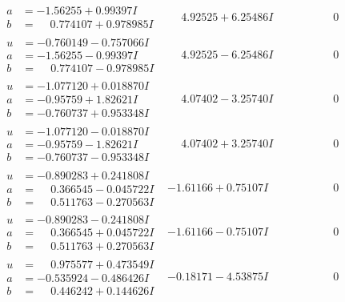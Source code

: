 \documentclass[1p]{elsarticle_modified}
\theoremstyle{definition}
\begin{document}
$$\begin{array}{c|c|c}
\begin{aligned}
a &= -1.56255 + 0.99397 I \\
b &= \phantom{-}0.774107 + 0.978985 I\end{aligned}
 & \phantom{-}4.92525 + 6.25486 I & \phantom{-0.000000 } 0 \\ \hline\begin{aligned}
u &= -0.760149 - 0.757066 I \\
a &= -1.56255 - 0.99397 I \\
b &= \phantom{-}0.774107 - 0.978985 I\end{aligned}
 & \phantom{-}4.92525 - 6.25486 I & \phantom{-0.000000 } 0 \\ \hline\begin{aligned}
u &= -1.077120 + 0.018870 I \\
a &= -0.95759 + 1.82621 I \\
b &= -0.760737 + 0.953348 I\end{aligned}
 & \phantom{-}4.07402 - 3.25740 I & \phantom{-0.000000 } 0 \\ \hline\begin{aligned}
u &= -1.077120 - 0.018870 I \\
a &= -0.95759 - 1.82621 I \\
b &= -0.760737 - 0.953348 I\end{aligned}
 & \phantom{-}4.07402 + 3.25740 I & \phantom{-0.000000 } 0 \\ \hline\begin{aligned}
u &= -0.890283 + 0.241808 I \\
a &= \phantom{-}0.366545 - 0.045722 I \\
b &= \phantom{-}0.511763 - 0.270563 I\end{aligned}
 & -1.61166 + 0.75107 I & \phantom{-0.000000 } 0 \\ \hline\begin{aligned}
u &= -0.890283 - 0.241808 I \\
a &= \phantom{-}0.366545 + 0.045722 I \\
b &= \phantom{-}0.511763 + 0.270563 I\end{aligned}
 & -1.61166 - 0.75107 I & \phantom{-0.000000 } 0 \\ \hline\begin{aligned}
u &= \phantom{-}0.975577 + 0.473549 I \\
a &= -0.535924 - 0.486426 I \\
b &= \phantom{-}0.446242 + 0.144626 I\end{aligned}
 & -0.18171 - 4.53875 I & \phantom{-0.000000 } 0 \\ \hline\begin{aligned}

\end{aligned}
\end{array}$$
\end{document}
